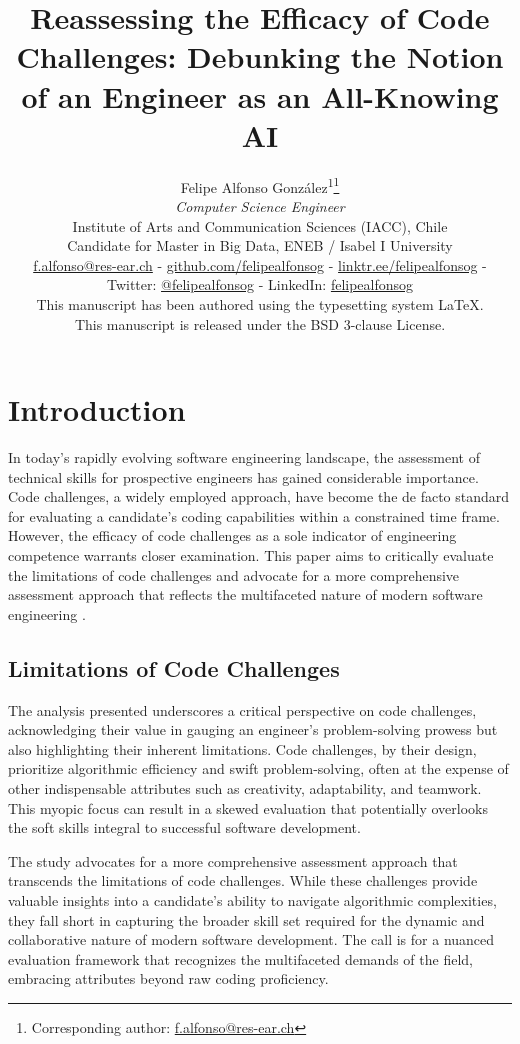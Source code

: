 \documentclass[
    a4paper, %
    10pt, %
    unnumberedsections, %
    twoside, %
]{LTJournalArticle}
\title{Reassessing the Efficacy of Code Challenges: Debunking the Notion of an Engineer as an All-Knowing AI}
\author{%
    Felipe Alfonso González\textsuperscript{1}\thanks{Corresponding author: \href{mailto:f.alfonso@res-ear.ch}{f.alfonso@res-ear.ch}}\\
    \textit{ Computer Science Engineer}\\
    \footnotesize Institute of Arts and Communication Sciences (IACC), Chile\\[-6pt]
    \footnotesize Candidate for Master in Big Data, ENEB / Isabel I University\\[-6pt]
    \footnotesize\href{mailto:f.alfonso@res-ear.ch}{f.alfonso@res-ear.ch} - 
    \footnotesize\href{https://github.com/felipealfonsog}{github.com/felipealfonsog} - 
    \href{https://linktr.ee/felipealfonsog}{linktr.ee/felipealfonsog} - 
    Twitter: \href{https://twitter.com/felipealfonsog}{@felipealfonsog} - 
    LinkedIn: \href{https://linkedin.com/in/felipealfonsog}{felipealfonsog}\\
    \scriptsize This manuscript has been authored using the typesetting system \LaTeX{}. \\[-6pt]
    \scriptsize This manuscript is released under the BSD 3-clause License. \\
}
\begin{document}
\maketitle %


\section{Introduction}

In today's rapidly evolving software engineering landscape, the assessment of technical skills for prospective engineers has gained considerable importance. Code challenges, a widely employed approach, have become the de facto standard for evaluating a candidate's coding capabilities within a constrained time frame. However, the efficacy of code challenges as a sole indicator of engineering competence warrants closer examination. This paper aims to critically evaluate the limitations of code challenges and advocate for a more comprehensive assessment approach that reflects the multifaceted nature of modern software engineering \cite{Smith2020,Johnson2019,Brown2021,Garcia2022}.

\subsection{Limitations of Code Challenges}

The analysis presented underscores a critical perspective on code challenges, acknowledging their value in gauging an engineer's problem-solving prowess but also highlighting their inherent limitations. Code challenges, by their design, prioritize algorithmic efficiency and swift problem-solving, often at the expense of other indispensable attributes such as creativity, adaptability, and teamwork. This myopic focus can result in a skewed evaluation that potentially overlooks the soft skills integral to successful software development.

The study advocates for a more comprehensive assessment approach that transcends the limitations of code challenges. While these challenges provide valuable insights into a candidate's ability to navigate algorithmic complexities, they fall short in capturing the broader skill set required for the dynamic and collaborative nature of modern software development. The call is for a nuanced evaluation framework that recognizes the multifaceted demands of the field, embracing attributes beyond raw coding proficiency.
\end{document}

